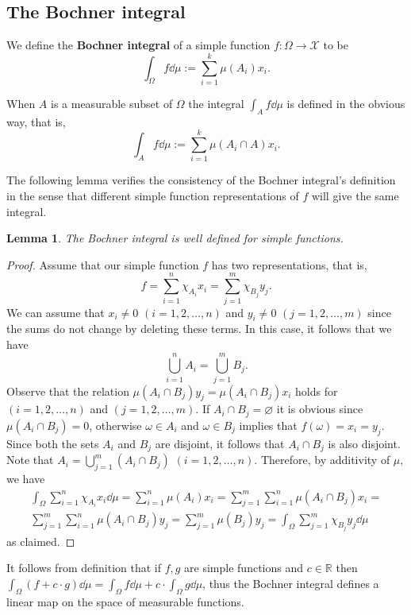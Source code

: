 \documentclass[a4paper, 12pt]{article}
\newtheorem{lem}{Lemma}[section]
\begin{document}
\subsection{The Bochner integral}
We define the \textbf{Bochner integral} of a simple function $f \colon \Omega \to \mathcal{X}$ to be
$$\int_{\Omega} f \dd{\mu} := \sum^k_{i=1} \mu(A_i)x_i.$$

When $A$ is a measurable subset of $\Omega$ the integral $\int_{A} f \dd{\mu}$ is defined in the obvious way, that is, $$\int_{A} f \dd{\mu} := \sum^k_{i=1} \mu(A_i \cap A)x_i.$$

The following lemma verifies the consistency of the Bochner integral's definition in the sense that different simple function representations of $f$ will give the same integral.
\begin{lem} \label{all:bochner_jol_def}
The Bochner integral is well defined for simple functions.
\end{lem}
\begin{proof} Assume that our simple function $f$ has two representations, that is, 
$$
f = \sum^{n}_{i=1} \chi_{A_i} x_i = \sum^{m}_{j=1}\chi_{B_j} y_j.
$$
We can assume that $x_i \neq 0$ $(i = 1,2,\ldots, n)$ and $y_i \neq 0$ $(j = 1,2,\ldots,m)$ since the sums do not change by deleting these terms.
In this case, it follows that we have
$$
\bigcup^{n}_{i=1} A_{i} = \bigcup^{m}_{j=1}B_{j}.
$$
Observe that the relation $\mu(A_i \cap B_j) y_j = \mu(A_i \cap B_j) x_i$ holds for  $(i = 1,2,\ldots, n)$ and $(j = 1,2,\ldots,m)$. If $A_i \cap B_j = \varnothing$ it is obvious since $\mu(A_i \cap B_j) = 0$, otherwise $\omega \in A_i$ and $\omega \in B_j$ implies that $f(\omega) = x_i = y_j$.
Since both the sets $A_i$ and $B_j$ are disjoint, it follows that $A_i \cap B_j$ is also disjoint. Note that $A_i = \bigcup^{m}_{j=1} (A_i \cap B_j)$ $(i=1,2,\ldots,n)$. Therefore, by additivity of $\mu$, we have
\begin{equation*}
\begin{split}
\int_{\Omega} \sum^{n}_{i=1} \chi_{A_i} x_i \dd{\mu} = \sum^{n}_{i=1} \mu(A_i) x_i = \sum^{m}_{j=1} \sum^{n}_{i=1}\mu(A_i \cap B_j)x_i = \\
\sum^{m}_{j=1} \sum^{n}_{i=1}\mu(A_i \cap B_j)y_j = \sum^{m}_{j=1}\mu(B_j) y_j = \int_{\Omega} \sum^{m}_{j=1}\chi_{B_j} y_j \dd{\mu}
\end{split}
\end{equation*}
as claimed.
\end{proof}
It follows from definition that if $f,g$ are simple functions and $c \in \mathbb{R}$ then $\int_{\Omega}(f+c \cdot g)\dd{\mu} = \int_{\Omega} f \dd{\mu} + c \cdot \int_{\Omega} g \dd{\mu}$, thus the Bochner integral defines a linear map on the space of measurable functions.
\end{document}
